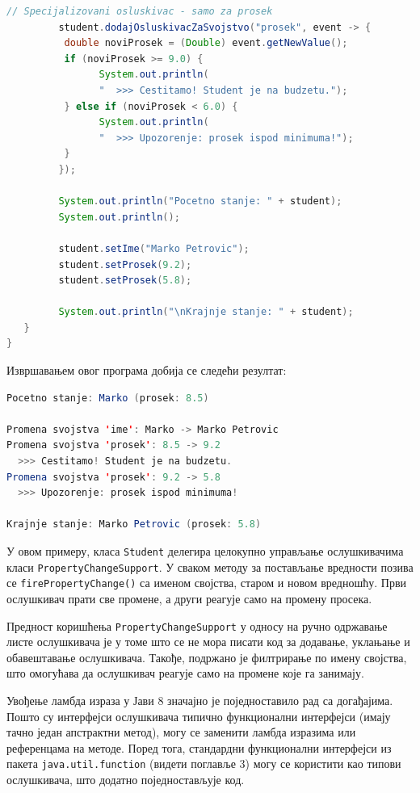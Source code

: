 \begin{lstlisting}[language=Java]
         // Specijalizovani osluskivac - samo za prosek
         student.dodajOsluskivacZaSvojstvo("prosek", event -> {
          double noviProsek = (Double) event.getNewValue();
          if (noviProsek >= 9.0) {
                System.out.println(
                "  >>> Cestitamo! Student je na budzetu.");
          } else if (noviProsek < 6.0) {
                System.out.println(
                "  >>> Upozorenje: prosek ispod minimuma!");
          }
         });
 
         System.out.println("Pocetno stanje: " + student);
         System.out.println();
 
         student.setIme("Marko Petrovic");
         student.setProsek(9.2);
         student.setProsek(5.8);
 
         System.out.println("\nKrajnje stanje: " + student);
   }
}
\end{lstlisting}


Извршавањем овог програма добија се следећи резултат:


\begin{lstlisting}[language=Java]
Pocetno stanje: Marko (prosek: 8.5)
 
Promena svojstva 'ime': Marko -> Marko Petrovic
Promena svojstva 'prosek': 8.5 -> 9.2
  >>> Cestitamo! Student je na budzetu.
Promena svojstva 'prosek': 9.2 -> 5.8
  >>> Upozorenje: prosek ispod minimuma!
 
Krajnje stanje: Marko Petrovic (prosek: 5.8)
\end{lstlisting}


У овом примеру, класа \texttt{Student} делегира целокупно управљање ослушкивачима класи \texttt{PropertyChangeSupport}. У сваком методу за постављање вредности позива се \texttt{firePropertyChange()} са именом својства, старом и новом вредношћу. Први ослушкивач прати све промене, а други реагује само на промену просека.

Предност коришћења \texttt{PropertyChangeSupport} у односу на ручно одржавање листе ослушкивача је у томе што се не мора писати код за додавање, уклањање и обавештавање ослушкивача. Такође, подржано је филтрирање по имену својства, што омогућава да ослушкивач реагује само на промене које га занимају.

Увођење ламбда израза у Јави 8 значајно је поједноставило рад са догађајима. Пошто су интерфејси ослушкивача типично функционални интерфејси (имају тачно један апстрактни метод), могу се заменити ламбда изразима или референцама на методе. Поред тога, стандардни функционални интерфејси из пакета \texttt{java.util.function} (видети поглавље 3) могу се користити као типови ослушкивача, што додатно поједностављује код.


